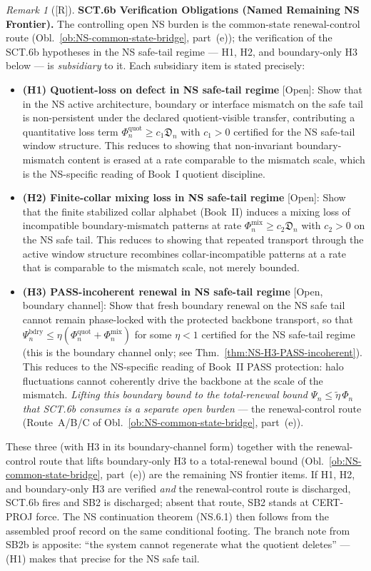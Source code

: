 \documentclass[12pt,oneside]{amsbook}
\theoremstyle{plain}
\theoremstyle{definition}
\theoremstyle{remark}
\newtheorem{remark}[theorem]{Remark}
\newcommand{\status}[1]{\textup{[#1]}}
\begin{document}
\begin{remark}[\status{R}]\label{rmk:SCT6b-verification-obligations}
\textbf{SCT.6b Verification Obligations (Named Remaining NS Frontier).}
The controlling open NS burden is the common-state
renewal-control route (Obl.~\ref{ob:NS-common-state-bridge},
part~(e)); the verification of the SCT.6b hypotheses in the NS
safe-tail regime --- H1, H2, and boundary-only H3 below --- is
\emph{subsidiary} to it. Each subsidiary item is stated precisely:
\begin{itemize}
\item \textbf{(H1) Quotient-loss on defect in NS safe-tail regime}
 [Open]: Show that in the NS active architecture, boundary or
 interface mismatch on the safe tail is non-persistent under the
 declared quotient-visible transfer, contributing a quantitative
 loss term $\Phi_n^{\mathrm{quot}} \geq c_1 \mathfrak{D}_n$ with
 $c_1>0$ certified for the NS safe-tail window structure. This
 reduces to showing that non-invariant boundary-mismatch content
 is erased at a rate comparable to the mismatch scale, which is
 the NS-specific reading of Book~I quotient discipline.
\item \textbf{(H2) Finite-collar mixing loss in NS safe-tail regime}
 [Open]: Show that the finite stabilized collar alphabet
 (Book~II) induces a mixing loss of incompatible boundary-mismatch
 patterns at rate $\Phi_n^{\mathrm{mix}} \geq c_2 \mathfrak{D}_n$
 with $c_2>0$ on the NS safe tail. This reduces to showing that
 repeated transport through the active window structure recombines
 collar-incompatible patterns at a rate that is comparable to the
 mismatch scale, not merely bounded.
\item \textbf{(H3) PASS-incoherent renewal in NS safe-tail regime}
 [Open, boundary channel]: Show that fresh boundary renewal on the
 NS safe tail cannot remain phase-locked with the protected
 backbone transport, so that
 $\Psi_n^{\mathrm{bdry}} \leq \eta(\Phi_n^{\mathrm{quot}} +
 \Phi_n^{\mathrm{mix}})$ for some $\eta < 1$ certified for the
 NS safe-tail regime (this is the boundary channel only; see
 Thm.~\ref{thm:NS-H3-PASS-incoherent}). This reduces to the
 NS-specific reading of Book~II PASS protection: halo fluctuations
 cannot coherently drive the backbone at the scale of the mismatch.
 \emph{Lifting this boundary bound to the total-renewal bound
 $\Psi_n \leq \widetilde\eta\,\Phi_n$ that SCT.6b consumes is a
 separate open burden} --- the renewal-control route
 (Route~A/B/C of Obl.~\ref{ob:NS-common-state-bridge}, part~(e)).
\end{itemize}
These three (with H3 in its boundary-channel form) together with
the renewal-control route that lifts boundary-only H3 to a
total-renewal bound (Obl.~\ref{ob:NS-common-state-bridge},
part~(e)) are the remaining NS frontier items. If H1, H2, and
boundary-only H3 are verified \emph{and} the renewal-control route
is discharged, SCT.6b fires and SB2 is discharged; absent that
route, SB2 stands at CERT-PROJ force. The NS continuation theorem
(NS.6.1) then follows from the assembled proof record on the same
conditional footing. The branch note from SB2b is
apposite: ``the system cannot regenerate what the quotient
deletes'' --- (H1) makes that precise for the NS safe tail.
\end{remark}
\end{document}
